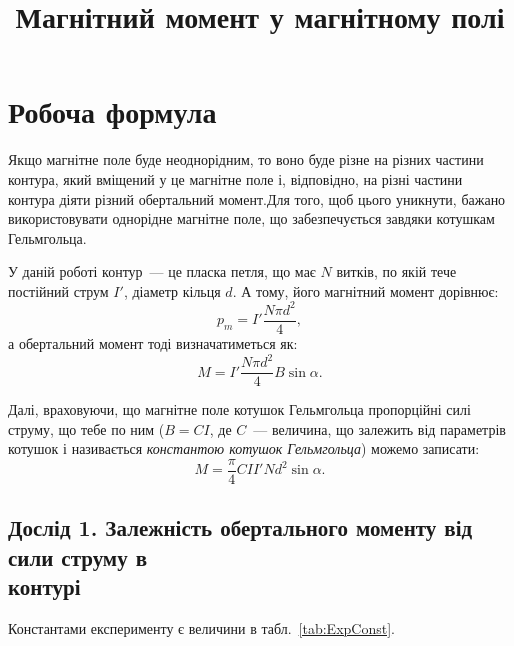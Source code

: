 \documentclass{LabWork}
\title{Магнітний момент у магнітному полі}
\begin{document}
\maketitle

%
\fputrue%
\fpufalse%
%
\section{Робоча формула}

Якщо магнітне поле буде неоднорідним, то воно буде різне на різних частини  контура, який вміщений у це магнітне поле і, відповідно, на різні частини контура діяти різний обертальний момент.Для того, щоб цього уникнути, бажано використовувати однорідне магнітне поле, що забезпечується завдяки котушкам Гельмгольца.

У даній роботі контур~--- це пласка петля, що має $N$ витків, по якій тече постійний струм $I'$, діаметр кільця $d$. А тому, його магнітний момент дорівнює:
\begin{equation*}\label{eq:pmE}
	p_m = I'\frac{N \pi d^2}{4},
\end{equation*}
а обертальний момент тоді визначатиметься як:
\begin{equation*}\label{}
	M = I'\frac{N \pi d^2}{4} B\sin\alpha.
\end{equation*}

Далі, враховуючи, що магнітне поле котушок Гельмгольца пропорційні силі струму, що тебе по ним ($B = CI$, де $C$~--- величина, що залежить від параметрів котушок і називається \emph{константою котушок Гельмгольца}) можемо записати:
\begin{equation}\label{eq:TorqueE}
	M = \frac{\pi}{4} CII'Nd^2\sin\alpha.
\end{equation}


\subsection{Дослід 1. Залежність обертального моменту від сили струму в \\контурі}

Константами експерименту є величини в табл.~\ref{tab:ExpConst}.

\end{document}
